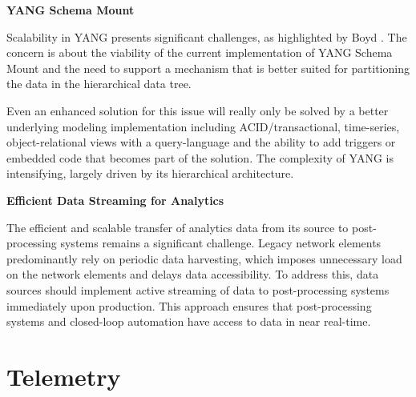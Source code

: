 \documentclass[11pt,sigconf]{iabart}
\begin{document}
\textbf{YANG Schema Mount}

Scalability in YANG presents significant challenges, as highlighted by Boyd \cite{boyd2023scalable}. The concern is about the viability of the current implementation of YANG Schema Mount \cite{RFC8528} and the need to support a mechanism that is better suited for partitioning the data in the hierarchical data tree.

Even an enhanced solution for this issue will really only be solved by a better underlying modeling implementation including ACID/transactional, time-series, object-relational views with a query-language and the ability to add triggers or embedded code that becomes part of the solution. The complexity of YANG is intensifying, largely driven by its hierarchical architecture.

\textbf{Efficient Data Streaming for Analytics}

The efficient and scalable transfer of analytics data from its source to post-processing systems remains a significant challenge. Legacy network elements predominantly rely on periodic data harvesting, which imposes unnecessary load on the network elements and delays data accessibility. To address this, data sources should implement active streaming of data to post-processing systems immediately upon production. This approach ensures that post-processing systems and closed-loop automation have access to data in near real-time.


\section{Telemetry} \label{telemetry}



\end{document}
